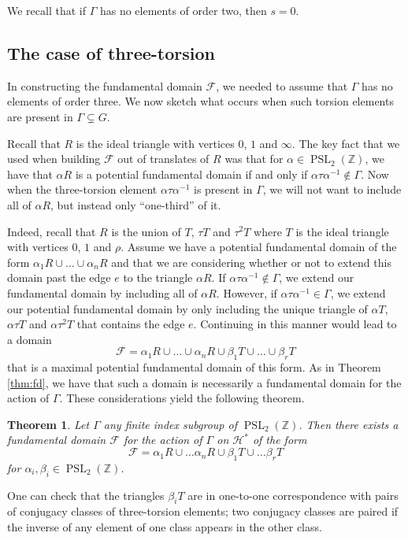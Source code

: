 \documentclass{amsart}
\theoremstyle{plain}
\newtheorem{thm}{Theorem}[section]
\theoremstyle{definition}
\newcommand{\F}{{\mathcal F}}
\renewcommand{\H}{\mathcal H}
\newcommand{\Z}{{\mathbb Z}}
\DeclareMathOperator{\PSL}{PSL}
\begin{document}
We recall that if $\Gamma$ has no elements of order two, then $s=0$.
\subsection{The case of three-torsion}

In constructing the fundamental domain $\F$, we needed to assume
that $\Gamma$ has no elements of order three.  We now sketch what
occurs when such torsion elements are present in $\Gamma
\subsetneq G$.

Recall that $R$ is the ideal triangle with vertices $0$, $1$ and
$\infty$.  The key fact that we used when building $\F$ out of
translates of $R$ was that for $\alpha \in \PSL_2(\Z)$, we have
that $\alpha R$ is a potential fundamental domain if and only if
$\alpha \tau \alpha^{-1} \notin \Gamma$.   Now when the three-torsion element $\alpha \tau \alpha^{-1}$ is present in $\Gamma$,
we will not want to include all of $\alpha R$, but instead only
``one-third'' of it.

Indeed, recall that $R$ is the union of $T$, $\tau T$ and $\tau^2
T$ where $T$ is the ideal triangle with vertices $0$, $1$ and
$\rho$.  Assume we have a potential fundamental domain of the form
$\alpha_1 R \cup \dots \cup \alpha_n R$ and that we are
considering whether or not to extend this domain past the edge $e$
to the triangle $\alpha R$.  If $\alpha \tau \alpha^{-1} \notin
\Gamma$, we extend our fundamental domain by including all of
$\alpha R$.  However, if $\alpha \tau \alpha^{-1} \in \Gamma$,
we extend our potential fundamental domain by only including the
unique triangle of $\alpha T$, $\alpha \tau T$ and $\alpha \tau^2 T$
that contains the edge $e$. Continuing in this manner would lead
to a domain
$$
\F = \alpha_1 R \cup \dots \cup \alpha_n R \cup \beta_1 T \cup
\dots \cup \beta_r T
$$
that is a maximal potential fundamental domain of this form.  As
in Theorem \ref{thm:fd}, we have that such a domain is necessarily
a fundamental domain for the action of $\Gamma$.  These
considerations yield the following theorem.

\begin{thm}
\label{thm:fd3}
Let $\Gamma$ any finite index subgroup of $\PSL_2(\Z)$.  Then
there exists a fundamental domain $\F$ for the action of $\Gamma$
on $\H^*$ of the form
$$
\F = \alpha_1 R \cup \dots \alpha_n R \cup \beta_1 T \cup \dots \beta_r T
$$
for $\alpha_i,\beta_i \in \PSL_2(\Z)$.
\end{thm}

One can check that the triangles $\beta_i T$ are in one-to-one
correspondence with pairs of conjugacy classes of three-torsion
elements; two conjugacy classes are paired if the inverse of any
element of one class appears in the other class.
\end{document}
